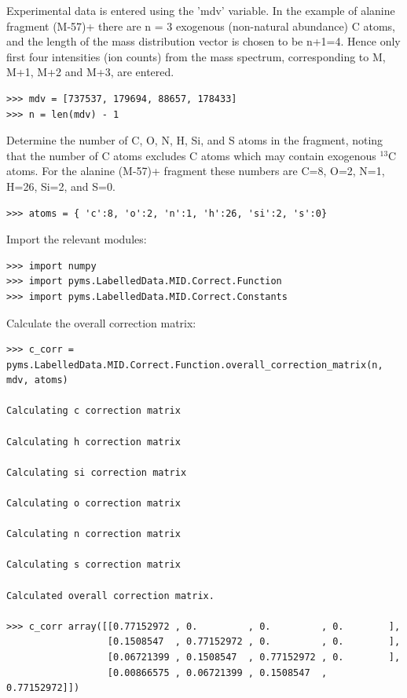 Experimental data is entered using the 'mdv' variable. In the example of
alanine fragment (M-57)+ \cite{nanchen07} there are n = 3 exogenous (non-natural
abundance) C atoms, and the length of the mass distribution vector
is chosen to be n+1=4. Hence only first four intensities (ion counts)
from the mass spectrum, corresponding to M, M+1, M+2 and M+3, are entered.

\begin{verbatim}
>>> mdv = [737537, 179694, 88657, 178433]
>>> n = len(mdv) - 1
\end{verbatim}

Determine the number of C, O, N, H, Si, and S atoms in the fragment,
noting that the number of C atoms excludes C atoms which may contain
exogenous $^{13}$C atoms. For the alanine (M-57)+ fragment these
numbers are C=8, O=2, N=1, H=26, Si=2, and S=0.

\begin{verbatim} 
>>> atoms = { 'c':8, 'o':2, 'n':1, 'h':26, 'si':2, 's':0}
\end{verbatim}

Import the relevant modules:

\begin{verbatim}
>>> import numpy
>>> import pyms.LabelledData.MID.Correct.Function
>>> import pyms.LabelledData.MID.Correct.Constants
\end{verbatim}

Calculate the overall correction matrix:

\begin{verbatim}
>>> c_corr = pyms.LabelledData.MID.Correct.Function.overall_correction_matrix(n, mdv, atoms)

Calculating c correction matrix

Calculating h correction matrix

Calculating si correction matrix

Calculating o correction matrix

Calculating n correction matrix

Calculating s correction matrix

Calculated overall correction matrix.

>>> c_corr array([[0.77152972 , 0.         , 0.         , 0.        ],
                  [0.1508547  , 0.77152972 , 0.         , 0.        ],
                  [0.06721399 , 0.1508547  , 0.77152972 , 0.        ],
                  [0.00866575 , 0.06721399 , 0.1508547  , 0.77152972]])
\end{verbatim}

